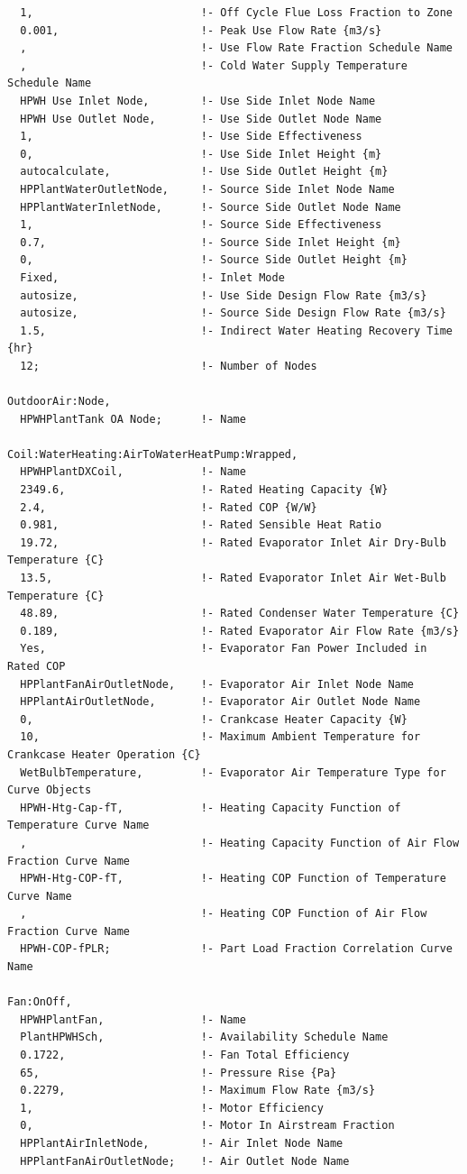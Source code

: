 \begin{lstlisting}
  1,                          !- Off Cycle Flue Loss Fraction to Zone
  0.001,                      !- Peak Use Flow Rate {m3/s}
  ,                           !- Use Flow Rate Fraction Schedule Name
  ,                           !- Cold Water Supply Temperature Schedule Name
  HPWH Use Inlet Node,        !- Use Side Inlet Node Name
  HPWH Use Outlet Node,       !- Use Side Outlet Node Name
  1,                          !- Use Side Effectiveness
  0,                          !- Use Side Inlet Height {m}
  autocalculate,              !- Use Side Outlet Height {m}
  HPPlantWaterOutletNode,     !- Source Side Inlet Node Name
  HPPlantWaterInletNode,      !- Source Side Outlet Node Name
  1,                          !- Source Side Effectiveness
  0.7,                        !- Source Side Inlet Height {m}
  0,                          !- Source Side Outlet Height {m}
  Fixed,                      !- Inlet Mode
  autosize,                   !- Use Side Design Flow Rate {m3/s}
  autosize,                   !- Source Side Design Flow Rate {m3/s}
  1.5,                        !- Indirect Water Heating Recovery Time {hr}
  12;                         !- Number of Nodes

OutdoorAir:Node,
  HPWHPlantTank OA Node;      !- Name

Coil:WaterHeating:AirToWaterHeatPump:Wrapped,
  HPWHPlantDXCoil,            !- Name
  2349.6,                     !- Rated Heating Capacity {W}
  2.4,                        !- Rated COP {W/W}
  0.981,                      !- Rated Sensible Heat Ratio
  19.72,                      !- Rated Evaporator Inlet Air Dry-Bulb Temperature {C}
  13.5,                       !- Rated Evaporator Inlet Air Wet-Bulb Temperature {C}
  48.89,                      !- Rated Condenser Water Temperature {C}
  0.189,                      !- Rated Evaporator Air Flow Rate {m3/s}
  Yes,                        !- Evaporator Fan Power Included in Rated COP
  HPPlantFanAirOutletNode,    !- Evaporator Air Inlet Node Name
  HPPlantAirOutletNode,       !- Evaporator Air Outlet Node Name
  0,                          !- Crankcase Heater Capacity {W}
  10,                         !- Maximum Ambient Temperature for Crankcase Heater Operation {C}
  WetBulbTemperature,         !- Evaporator Air Temperature Type for Curve Objects
  HPWH-Htg-Cap-fT,            !- Heating Capacity Function of Temperature Curve Name
  ,                           !- Heating Capacity Function of Air Flow Fraction Curve Name
  HPWH-Htg-COP-fT,            !- Heating COP Function of Temperature Curve Name
  ,                           !- Heating COP Function of Air Flow Fraction Curve Name
  HPWH-COP-fPLR;              !- Part Load Fraction Correlation Curve Name

Fan:OnOff,
  HPWHPlantFan,               !- Name
  PlantHPWHSch,               !- Availability Schedule Name
  0.1722,                     !- Fan Total Efficiency
  65,                         !- Pressure Rise {Pa}
  0.2279,                     !- Maximum Flow Rate {m3/s}
  1,                          !- Motor Efficiency
  0,                          !- Motor In Airstream Fraction
  HPPlantAirInletNode,        !- Air Inlet Node Name
  HPPlantFanAirOutletNode;    !- Air Outlet Node Name
\end{lstlisting}


